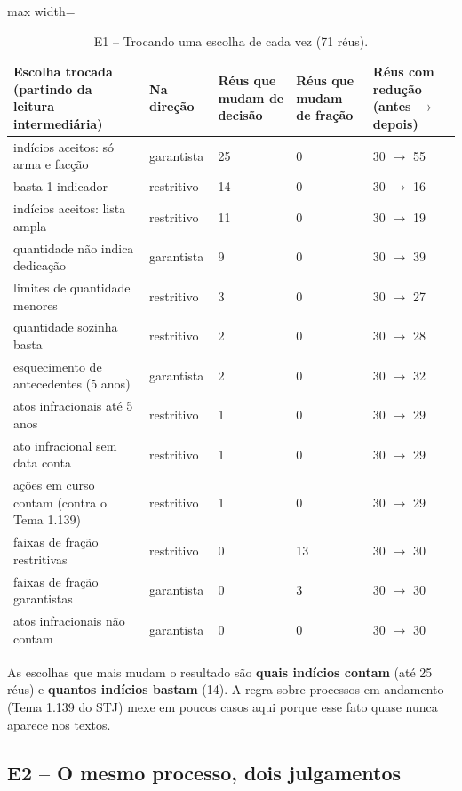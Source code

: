 \begin{table}[h]
\centering\small
\caption{E1 -- Trocando uma escolha de cada vez (71 réus).}
\label{tab:e1-ablacao}
\begin{adjustbox}{max width=\textwidth}
\begin{tabular}{p{5.6cm}lp{1.9cm}p{1.9cm}p{2.4cm}}
\toprule
Escolha trocada (partindo da leitura intermediária) & Na direção & Réus que mudam de decisão & Réus que mudam de fração & Réus com redução (antes $\to$ depois) \\
\midrule
indícios aceitos: só arma e facção & garantista & 25 & 0 & 30 $\to$ 55 \\
basta 1 indicador & restritivo & 14 & 0 & 30 $\to$ 16 \\
indícios aceitos: lista ampla & restritivo & 11 & 0 & 30 $\to$ 19 \\
quantidade não indica dedicação & garantista & 9 & 0 & 30 $\to$ 39 \\
limites de quantidade menores & restritivo & 3 & 0 & 30 $\to$ 27 \\
quantidade sozinha basta & restritivo & 2 & 0 & 30 $\to$ 28 \\
esquecimento de antecedentes (5 anos) & garantista & 2 & 0 & 30 $\to$ 32 \\
atos infracionais até 5 anos & restritivo & 1 & 0 & 30 $\to$ 29 \\
ato infracional sem data conta & restritivo & 1 & 0 & 30 $\to$ 29 \\
ações em curso contam (contra o Tema 1.139) & restritivo & 1 & 0 & 30 $\to$ 29 \\
faixas de fração restritivas & restritivo & 0 & 13 & 30 $\to$ 30 \\
faixas de fração garantistas & garantista & 0 & 3 & 30 $\to$ 30 \\
atos infracionais não contam & garantista & 0 & 0 & 30 $\to$ 30 \\
\bottomrule
\end{tabular}
\end{adjustbox}
\end{table}

As escolhas que mais mudam o resultado são \textbf{quais indícios contam} (até 25 réus) e
\textbf{quantos indícios bastam} (14). A regra sobre processos em andamento (Tema 1.139 do
STJ) mexe em poucos casos aqui porque esse fato quase nunca aparece nos textos.

\subsection*{E2 -- O mesmo processo, dois julgamentos}

